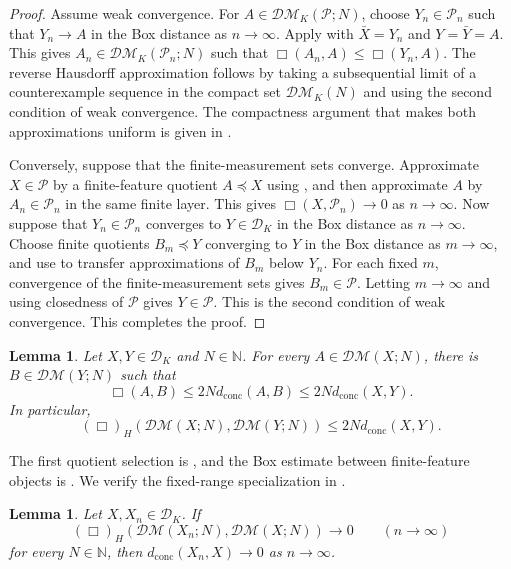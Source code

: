 \documentclass[10pt,a4paper]{amsart}
\newtheorem{lemma}[theorem]{Lemma}
\newcommand{\DK}{\mathcal D_K}
\newcommand{\DM}{\mathcal{DM}}
\newcommand{\dconc}{d_{\mathrm{conc}}}
\begin{document}
\begin{proof}
Assume weak convergence. For $A\in\DM_K(\mathcal P;N)$, choose $Y_n\in\mathcal P_n$ such that $Y_n\to A$ in the Box distance as $n\to\infty$. Apply  with $\bar X=Y_n$ and $Y=\bar Y=A$. This gives $A_n\in\DM_K(\mathcal P_n;N)$ such that $\Box(A_n,A)\leq\Box(Y_n,A)$. The reverse Hausdorff approximation follows by taking a subsequential limit of a counterexample sequence in the compact set $\DM_K(N)$ and using the second condition of weak convergence. The compactness argument that makes both approximations uniform is given in .

Conversely, suppose that the finite-measurement sets converge. Approximate $X\in\mathcal P$ by a finite-feature quotient $A\preceq X$ using , and then approximate $A$ by $A_n\in\mathcal P_n$ in the same finite layer. This gives $\Box(X,\mathcal P_n)\to0$ as $n\to\infty$. Now suppose that $Y_n\in\mathcal P_n$ converges to $Y\in\DK$ in the Box distance as $n\to\infty$. Choose finite quotients $B_m\preceq Y$ converging to $Y$ in the Box distance as $m\to\infty$, and use  to transfer approximations of $B_m$ below $Y_n$. For each fixed $m$, convergence of the finite-measurement sets gives $B_m\in\mathcal P$. Letting $m\to\infty$ and using closedness of $\mathcal P$ gives $Y\in\mathcal P$. This is the second condition of weak convergence. This completes the proof.
\end{proof}

\begin{lemma}
\label{lem:finite-measurement-proximity}
Let $X,Y\in\DK$ and $N\in\mathbb N$. For every $A\in\DM(X;N)$, there is $B\in\DM(Y;N)$ such that
\[
\Box(A,B)\leq2N\dconc(A,B)\leq2N\dconc(X,Y).
\]
In particular,
\[
(\Box)_H(\DM(X;N),\DM(Y;N))\leq2N\dconc(X,Y).
\]
\end{lemma}

The first quotient selection is \cite[Lemma~6.10]{gds2}, and the Box estimate between finite-feature objects is \cite[Proposition~6.8]{gds2}. We verify the fixed-range specialization in .

\begin{lemma}
\label{lem:finite-measurement-reconstruction}
Let $X,X_n\in\DK$. If
\[
(\Box)_H(\DM(X_n;N),\DM(X;N))\longrightarrow0\qquad(n\to\infty)
\]
for every $N\in\mathbb N$, then $\dconc(X_n,X)\to0$ as $n\to\infty$.
\end{lemma}
\end{document}
